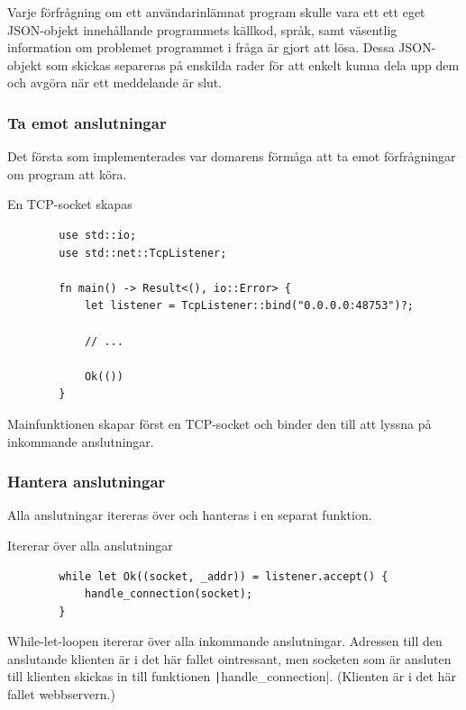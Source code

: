 \documentclass{article}
\begin{document}
Varje förfrågning om ett användarinlämnat program skulle vara ett ett eget
JSON-objekt innehållande programmets källkod, språk, samt väsentlig information
om problemet programmet i fråga är gjort att lösa. Dessa JSON-objekt som skickas
separeras på enskilda rader för att enkelt kunna dela upp dem och avgöra när ett
meddelande är slut.

\subsubsection{Ta emot anslutningar}

Det första som implementerades var domarens förmåga att ta emot förfrågningar om
program att köra.

\begin{listing}[H]
	\caption{En TCP-socket skapas}
	\begin{verbatim}
		use std::io;
		use std::net::TcpListener;

		fn main() -> Result<(), io::Error> {
			let listener = TcpListener::bind("0.0.0.0:48753")?;

			// ...

			Ok(())
		}
	\end{verbatim}
\end{listing}

Mainfunktionen skapar först en TCP-socket och binder den till att lyssna på
inkommande anslutningar.

\subsubsection{Hantera anslutningar}

Alla anslutningar itereras över och hanteras i en separat funktion.

\begin{listing}[H]
	\caption{Itererar över alla anslutningar}
	\begin{verbatim}
		while let Ok((socket, _addr)) = listener.accept() {
			handle_connection(socket);
		}
	\end{verbatim}
\end{listing}

While-let-loopen itererar över alla inkommande anslutningar.  Adressen till den
anslutande klienten är i det här fallet ointressant, men socketen som är
ansluten till klienten skickas in till funktionen
\texttt|handle_connection|.
(Klienten är i det här fallet webbservern.)
\end{document}
